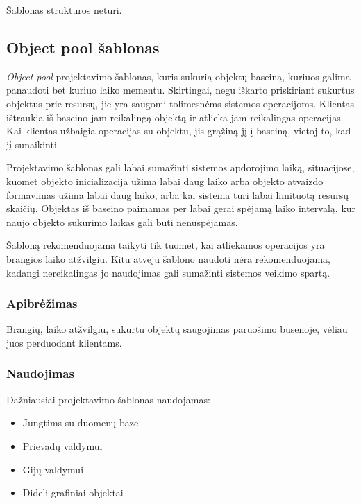 \documentclass[10pt]{IEEEtran}
\begin{document}
				Šablonas struktūros neturi.

		\subsection{Object pool šablonas}

			\textit{Object pool} projektavimo šablonas, kuris sukurią objektų baseiną, kuriuos galima panaudoti bet kuriuo laiko mementu. Skirtingai, negu iškarto priskiriant sukurtus objektus prie resursų, jie yra saugomi tolimesnėms sistemos operacijoms. Klientas ištraukia iš baseino jam reikalingą objektą ir atlieka jam reikalingas operacijas. Kai klientas užbaigia operacijas su objektu, jis grąžiną jį į baseiną, vietoj to, kad jį sunaikinti.

			Projektavimo šablonas gali labai sumažinti sistemos apdorojimo laiką, situacijose, kuomet objekto inicializacija užima labai daug laiko arba objekto atvaizdo formavimas užima labai daug laiko, arba kai sistema turi labai limituotą resursų skaičių. Objektas iš baseino paimamas per labai gerai spėjamą laiko intervalą, kur naujo objekto sukūrimo laikas gali būti nenuspėjamas.

			Šabloną rekomenduojama taikyti tik tuomet, kai atliekamos operacijos yra brangios laiko atžvilgiu. Kitu atveju šablono naudoti nėra rekomenduojama, kadangi nereikalingas jo naudojimas gali sumažinti sistemos veikimo spartą.

			\subsubsection{Apibrėžimas}

				Brangių, laiko atžvilgiu, sukurtu objektų saugojimas paruošimo būsenoje, vėliau juos perduodant klientams.

			\subsubsection{Naudojimas}

				Dažniausiai projektavimo šablonas naudojamas:

				\begin{itemize}
					\item Jungtims su duomenų baze
					\item Prievadų valdymui
					\item Gijų valdymui
					\item Dideli grafiniai objektai
				\end{itemize}
\end{document}

